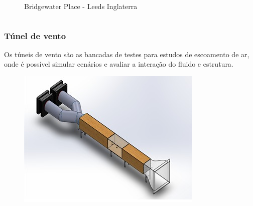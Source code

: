 \begin{frame}
\begin{columns}
\begin{column}{0.5\textwidth}
\begin{figure}
            \caption{Bridgewater Place - Leeds Inglaterra}
            \end{figure}
        \end{column}
    \end{columns}
\end{frame}
    


\begin{frame}
\frametitle{Túnel de vento}

Os túneis de vento são as bancadas de testes para estudos de escoamento de ar, onde é possível simular cenários e avaliar a interação do fluido e estrutura.

\begin{figure}
\centering
\includegraphics[scale = 0.4]{figuras/tuneldeventosombreado}
\end{figure}

\end{frame}
 
